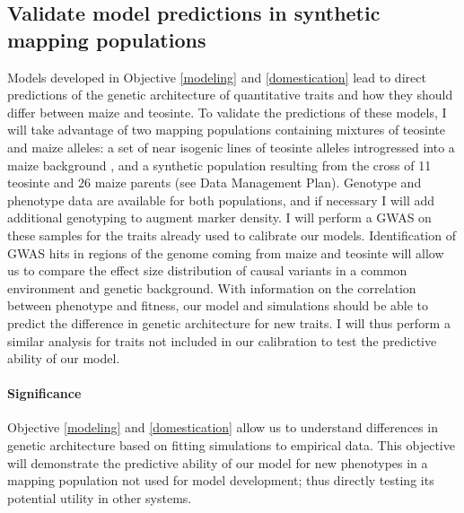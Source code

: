 \vspace{-1ex}
\subsection{Validate model predictions in synthetic mapping populations}\vspace{-1ex}
\label{validation}

Models developed in Objective \ref{modeling} and \ref{domestication} lead to direct predictions of the genetic architecture of quantitative traits and how they should differ between maize and teosinte. To validate the predictions of these models, I will take advantage of two mapping populations containing mixtures of teosinte and maize alleles: a set of near isogenic lines of teosinte alleles introgressed into a maize background \citep{Liu:InPress}, and a synthetic population resulting from the cross of 11 teosinte and 26 maize parents (see Data Management Plan). Genotype and phenotype data are available for both populations, and if necessary I will add additional genotyping to augment marker density.
I will perform a GWAS on these samples for the traits already used to calibrate our models. Identification of GWAS hits in regions of the genome coming from maize and teosinte will allow us to compare the effect size distribution of causal variants in a common environment and genetic background. With information on the correlation between phenotype and fitness, our model and simulations should be able to predict the difference in genetic architecture for new traits. I will thus perform a similar analysis for traits not included in our calibration to test the predictive ability of our model. 

\paragraph{Significance}
Objective \ref{modeling} and \ref{domestication} allow us to understand differences in genetic architecture based on fitting simulations to empirical data. This objective will demonstrate the predictive ability of our model for new phenotypes in a mapping population not used for model development; thus directly testing its potential utility in other systems.

